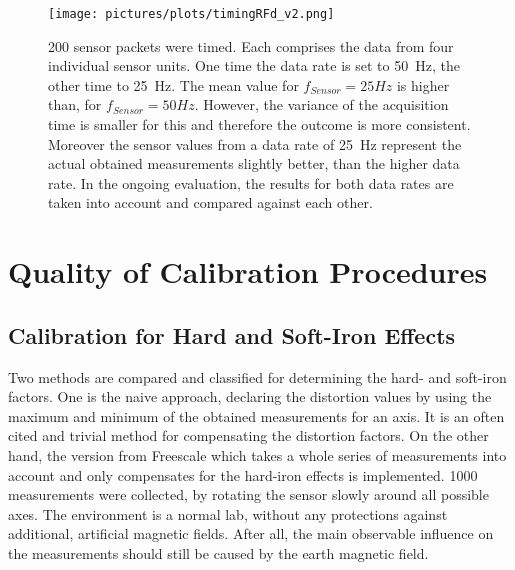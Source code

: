 \begin{figure}[!htb]
\centering
\texttt{[image: pictures/plots/timingRFd\_v2.png]}
\caption[Timing behaviour of sensor system]
{200 sensor packets were timed. Each comprises the data from four individual sensor units. One time the data rate is set to \SI{50}{\Hz}, the other time to \SI{25}{\Hz}. The mean value for $ f_{Sensor}=25\si{Hz} $ is higher than, for $ f_{Sensor}=50\si{Hz} $. However, the variance of the acquisition time is smaller for this and therefore the outcome is more consistent. Moreover the sensor values from a data rate of \SI{25}{\Hz} represent the actual obtained measurements slightly better, than the higher data rate. In the ongoing evaluation, the results for both data rates are taken into account and compared against each other.}
\label{fig:sensTime}
\end{figure}

\FloatBarrier
\section{Quality of Calibration Procedures} \label{sec:cali}

\subsection{Calibration for Hard and Soft-Iron Effects}\label{subsec:resHardSoft}

Two methods are compared and classified for determining the hard- and soft-iron factors. One is the naive approach, declaring the distortion values by using the maximum and minimum of the obtained measurements for an axis. It is an often cited and trivial method for compensating the distortion factors. On the other hand, the version from Freescale \cite{ozyagcilar2012calibrating} which takes a whole series of measurements into account and only compensates for the hard-iron effects is implemented. 1000 measurements were collected, by rotating the sensor slowly around all possible axes. The environment is a normal lab, without any protections against additional, artificial magnetic fields. After all, the main observable influence on the measurements should still be caused by the earth magnetic field.

